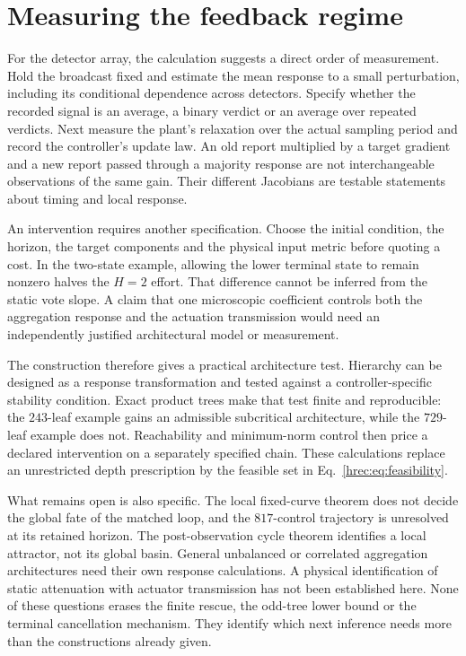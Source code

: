 \section{Measuring the feedback regime}
\label{hrec:sec:consequence}
For the detector array, the calculation suggests a direct order of measurement. Hold the broadcast fixed and estimate the mean response to a small perturbation, including its conditional dependence across detectors. Specify whether the recorded signal is an average, a binary verdict or an average over repeated verdicts. Next measure the plant's relaxation over the actual sampling period and record the controller's update law. An old report multiplied by a target gradient and a new report passed through a majority response are not interchangeable observations of the same gain. Their different Jacobians are testable statements about timing and local response.

An intervention requires another specification. Choose the initial condition, the horizon, the target components and the physical input metric before quoting a cost. In the two-state example, allowing the lower terminal state to remain nonzero halves the \(H=2\) effort. That difference cannot be inferred from the static vote slope. A claim that one microscopic coefficient controls both the aggregation response and the actuation transmission would need an independently justified architectural model or measurement.

The construction therefore gives a practical architecture test. Hierarchy can be designed as a response transformation and tested against a controller-specific stability condition. Exact product trees make that test finite and reproducible: the \(243\)-leaf example gains an admissible subcritical architecture, while the \(729\)-leaf example does not. Reachability and minimum-norm control then price a declared intervention on a separately specified chain. These calculations replace an unrestricted depth prescription by the feasible set in Eq.~\eqref{hrec:eq:feasibility}.

What remains open is also specific. The local fixed-curve theorem does not decide the global fate of the matched loop, and the \(817\)-control trajectory is unresolved at its retained horizon. The post-observation cycle theorem identifies a local attractor, not its global basin. General unbalanced or correlated aggregation architectures need their own response calculations. A physical identification of static attenuation with actuator transmission has not been established here. None of these questions erases the finite rescue, the odd-tree lower bound or the terminal cancellation mechanism. They identify which next inference needs more than the constructions already given.

